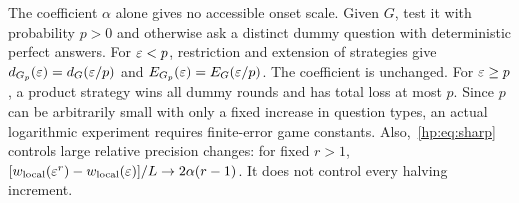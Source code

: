 The coefficient $\alpha$ alone gives no accessible onset scale. Given $G$, test it with probability $p>0$ and otherwise ask a distinct dummy question with deterministic perfect answers. For $\varepsilon<p$, restriction and extension of strategies give $d_{G_p}(\varepsilon)=d_G(\varepsilon/p)$ and $E_{G_p}(\varepsilon)=E_G(\varepsilon/p)$. The coefficient is unchanged. For $\varepsilon\ge p$, a product strategy wins all dummy rounds and has total loss at most $p$. Since $p$ can be arbitrarily small with only a fixed increase in question types, an actual logarithmic experiment requires finite-error game constants. Also,~\eqref{hp:eq:sharp} controls large relative precision changes: for fixed $r>1$, $[w_{\rm local}(\varepsilon^r)-w_{\rm local}(\varepsilon)]/L\to2\alpha(r-1)$. It does not control every halving increment.
